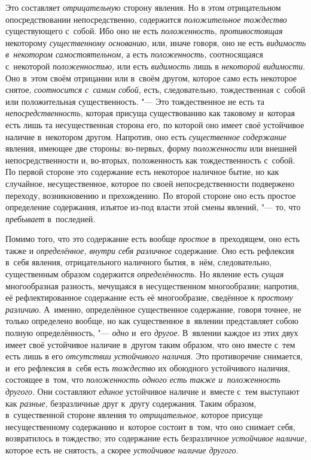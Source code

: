 Это составляет {\em отрицательную} сторону явления. Но в
этом отрицательном опосредствовании непосредственно, содержится
{\em положительное тождество} существующего с~собой.
Ибо оно не есть {\em положенность,}
{\em противостоящая} некоторому
{\em существенному основанию,} или, иначе говоря, оно
не есть {\em видимость в~некотором самостоятельном,} а
есть {\em положенность,} соотносящаяся с~некоторой
{\em положенностью,} или есть
{\em видимость} лишь в
{\em некоторой видимости}. Оно в~этом своём отрицании
или в~своём другом, которое само есть некоторое снятое,
{\em соотносится с~самим собой,} есть, следовательно,
тождественная с~собой или положительная существенность. "--- Это тождественное
не есть та {\em непосредственность,} которая присуща
существованию как таковому и~которая есть лишь та несущественная сторона
его, по которой оно имеет своё устойчивое наличие в~некотором другом.
Напротив, оно есть {\em существенное содержание}
явления, имеющее две стороны: во-первых, форму
{\em положенности} или внешней непосредственности и,
во-вторых, положенность как тождественность с~собой. По первой стороне это
содержание есть некоторое наличное бытие, но как случайное, несущественное,
которое по своей непосредственности подвержено переходу, возникновению и
прехождению. По второй стороне оно есть простое определение содержания,
изъятое из-под власти этой смены явлений, "--- то, что
{\em пребывает} в~последней.

Помимо того, что это содержание есть вообще
{\em простое} в~преходящем, оно есть также и
{\em определённое, внутри себя различное}
содержание. Оно есть рефлексия в~себя явления,
отрицательного наличного бытия, в~нём, следовательно, существенным образом
содержится {\em определённость}. Но явление есть
{\em сущая} многообразная разность, мечущаяся в
несущественном многообразии; напротив, её рефлектированное содержание есть
её многообразие, сведённое к {\em простому различию}.
А~именно, определённое существенное содержание, говоря точнее, не только
определено вообще, но как существенное в~явлении представляет собою полную
определённость, "--- {\em одно} и~его
{\em другое}. В~явлении каждое из этих двух имеет своё
устойчивое наличие в~другом таким образом, что оно вместе с~тем есть лишь в
его {\em отсутствии устойчивого наличия}. Это
противоречие снимается, и~его рефлексия в~себя есть
{\em тождество} их обоюдного устойчивого наличия,
состоящее в~том, что {\em положенность одного есть
также и~положенность другого}. Они составляют
{\em единое} устойчивое наличие и~вместе с~тем
выступают как {\em разные,} безразличные друг к~другу
содержания. Таким образом, в~существенной стороне явления то
{\em отрицательное,} которое присуще несущественному
содержанию и~которое состоит в~том, что оно снимает себя, возвратилось в
тождество; это содержание есть безразличное
{\em устойчивое наличие,} которое есть не снятость, а
скорее {\em устойчивое наличие другого}.

